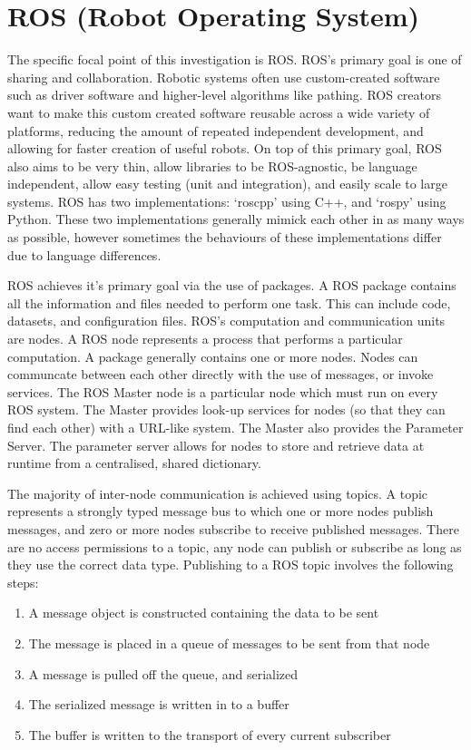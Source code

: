 \documentclass[../dissertation.tex]{subfiles}
\begin{document}
\section{ROS (Robot Operating System)}
\label{background-ros}

The specific focal point of this investigation is ROS. ROS's primary goal is one of sharing and collaboration. Robotic systems often use custom-created software such as driver software and higher-level algorithms like pathing. ROS creators want to make this custom created software reusable across a wide variety of platforms, reducing the amount of repeated independent development, and allowing for faster creation of useful robots. On top of this primary goal, ROS also aims to be very thin, allow libraries to be ROS-agnostic, be language independent, allow easy testing (unit and integration), and easily scale to large systems. ROS has two implementations: `roscpp' using C++, and `rospy' using Python. These two implementations generally mimick each other in as many ways as possible, however sometimes the behaviours of these implementations differ due to language differences.

ROS achieves it's primary goal via the use of packages. A ROS package contains all the information and files needed to perform one task. This can include code, datasets, and configuration files. ROS's computation and communication units are nodes. A ROS node represents a process that performs a particular computation. A package generally contains one or more nodes. Nodes can communcate between each other directly with the use of messages, or invoke services. The ROS Master node is a particular node which must run on every ROS system. The Master provides look-up services for nodes (so that they can find each other) with a URL-like system. The Master also provides the Parameter Server. The parameter server allows for nodes to store and retrieve data at runtime from a centralised, shared dictionary.

The majority of inter-node communication is achieved using topics. A topic represents a strongly typed message bus to which one or more nodes publish messages, and zero or more nodes subscribe to receive published messages. There are no access permissions to a topic, any node can publish or subscribe as long as they use the correct data type. Publishing to a ROS topic involves the following steps:

\begin{enumerate}
  \item A message object is constructed containing the data to be sent
  \item The message is placed in a queue of messages to be sent from that node
  \item A message is pulled off the queue, and serialized
  \item The serialized message is written in to a buffer
  \item The buffer is written to the transport of every current subscriber
\end{enumerate}
\end{document}
